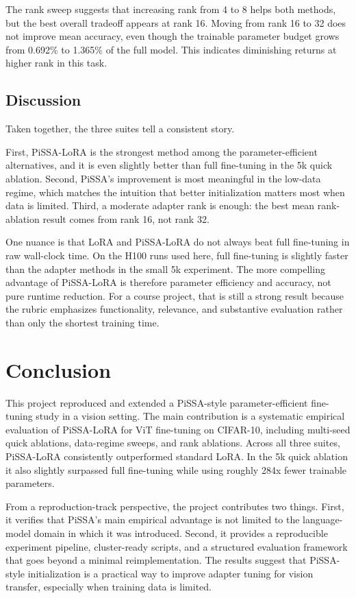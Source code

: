 \documentclass{article}
\begin{document}
The rank sweep suggests that increasing rank from 4 to 8 helps both methods, but the best overall tradeoff appears at rank 16. Moving from rank 16 to 32 does not improve mean accuracy, even though the trainable parameter budget grows from 0.692\% to 1.365\% of the full model. This indicates diminishing returns at higher rank in this task.

\subsection{Discussion}

Taken together, the three suites tell a consistent story.

First, PiSSA-LoRA is the strongest method among the parameter-efficient alternatives, and it is even slightly better than full fine-tuning in the 5k quick ablation. Second, PiSSA's improvement is most meaningful in the low-data regime, which matches the intuition that better initialization matters most when data is limited. Third, a moderate adapter rank is enough: the best mean rank-ablation result comes from rank 16, not rank 32.

One nuance is that LoRA and PiSSA-LoRA do not always beat full fine-tuning in raw wall-clock time. On the H100 runs used here, full fine-tuning is slightly faster than the adapter methods in the small 5k experiment. The more compelling advantage of PiSSA-LoRA is therefore parameter efficiency and accuracy, not pure runtime reduction. For a course project, that is still a strong result because the rubric emphasizes functionality, relevance, and substantive evaluation rather than only the shortest training time.

\section{Conclusion}

This project reproduced and extended a PiSSA-style parameter-efficient fine-tuning study in a vision setting. The main contribution is a systematic empirical evaluation of PiSSA-LoRA for ViT fine-tuning on CIFAR-10, including multi-seed quick ablations, data-regime sweeps, and rank ablations. Across all three suites, PiSSA-LoRA consistently outperformed standard LoRA. In the 5k quick ablation it also slightly surpassed full fine-tuning while using roughly 284x fewer trainable parameters.

From a reproduction-track perspective, the project contributes two things. First, it verifies that PiSSA's main empirical advantage is not limited to the language-model domain in which it was introduced. Second, it provides a reproducible experiment pipeline, cluster-ready scripts, and a structured evaluation framework that goes beyond a minimal reimplementation. The results suggest that PiSSA-style initialization is a practical way to improve adapter tuning for vision transfer, especially when training data is limited.
\end{document}
